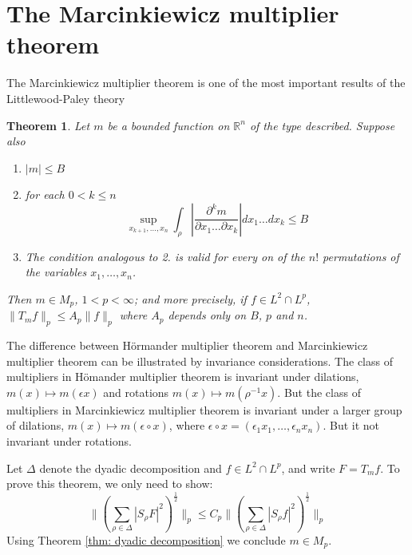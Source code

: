 \documentclass{report}
\theoremstyle{definition}
\theoremstyle{definition}
\theoremstyle{plain}
\newtheorem{theorem}{Theorem}
\numberwithin{theorem}{section}
\numberwithin{remark}{section}
\numberwithin{equation}{section}
\newcommand{\norm}[1]{\lVert#1\rVert}
\newcommand{\abs}[1]{\left\lvert#1\right\rvert}
\begin{document}
\section{The Marcinkiewicz multiplier theorem}
The Marcinkiewicz multiplier theorem is one of the most important results of the Littlewood-Paley theory
\begin{theorem}
    Let $m$ be a bounded function on $\mathbb{R}^n$ of the type described. Suppose also
    \begin{enumerate}
        \item $\abs{m}\leq B$
        \item for each $0<k\leq n$
        \begin{equation*}
            \sup_{x_{k+1},\dots,x_n}\int_{\rho}\abs{\frac{\partial^km}{\partial x_1\dots\partial x_k}}dx_1\dots dx_k\leq B
        \end{equation*}
        \item The condition analogous to 2. is valid for every on of the $n!$ permutations of the variables $x_1,\dots,x_n$.
    \end{enumerate}
    Then $m\in M_p$, $1<p<\infty$; and more precisely, if $f\in L^2\cap L^p$, $\norm{T_mf}_p\leq A_p\norm{f}_p$ where $A_p$ depends only on $B$, $p$ and $n$.
\end{theorem}
The difference between H\"ormander multiplier theorem and Marcinkiewicz multiplier theorem can be illustrated by invariance considerations. The class of multipliers in H\"omander multiplier theorem is invariant under dilations, $m(x)\mapsto m(\epsilon x)$ and rotations $m(x)\mapsto m(\rho^{-1} x)$. But the class of multipliers in Marcinkiewicz multiplier theorem is invariant under a larger group of dilations, $m(x)\mapsto m(\epsilon\circ x)$, where $\epsilon\circ x=(\epsilon_1x_1,\dots,\epsilon_nx_n)$. But it not invariant under rotations.\par
Let $\Delta$ denote the dyadic decomposition and $f\in L^2\cap L^p$, and write $F=T_mf$. To prove this theorem, we only need to show:
\begin{equation*}
    \norm{(\sum_{\rho\in \Delta}\abs{S_\rho F}^2)^\frac{1}{2}}_p\leq C_p\norm{(\sum_{\rho\in \Delta}\abs{S_\rho f}^2)^\frac{1}{2}}_p
\end{equation*}
Using Theorem \ref{thm: dyadic decomposition} we conclude $m\in M_p$.
\end{document}
